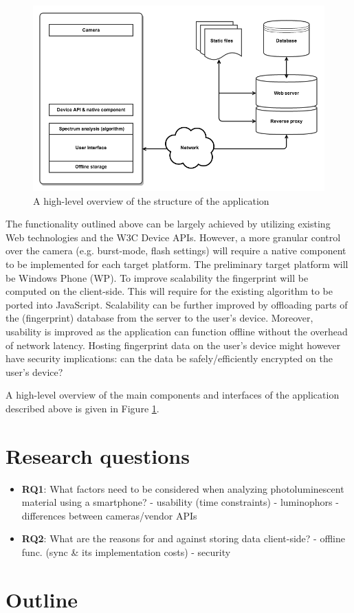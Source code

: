 \documentclass[thesis.tex]{subfiles}
\begin{document}
\begin{figure}[hbs]
\centering \includegraphics[width=13.25cm]{images/diagram_0404}
\caption{A high-level overview of the structure of the application \label{fig:diagram}}
\end{figure}

The functionality outlined above can be largely achieved by utilizing existing Web technologies and the W3C Device APIs. However, a more granular control over the camera (e.g. burst-mode, flash settings) will require a native component to be implemented for each target platform. The preliminary target platform will be Windows Phone (WP). To improve scalability the fingerprint will be computed on the client-side. This will require for the existing algorithm to be ported into JavaScript. Scalability can be further improved by offloading parts of the (fingerprint) database from the server to the user's device. Moreover, usability is improved as the application can function offline without the overhead of network latency. Hosting fingerprint data on the user's device might however have security implications: can the data be safely/efficiently encrypted on the user's device?

A high-level overview of the main components and interfaces of the application described above is given in Figure \ref{fig:diagram}.

\section{Research questions}


\begin{itemize}
	\item \textbf{RQ1}: What factors need to be considered when analyzing photoluminescent material using a smartphone?
	- usability (time constraints)
	- luminophors
	- differences between cameras/vendor APIs
	\item \textbf{RQ2}: What are the reasons for and against storing data client-side?
	- offline func. (sync \& its implementation costs)
	- security
\end{itemize}

\section{Outline}
\end{document}
